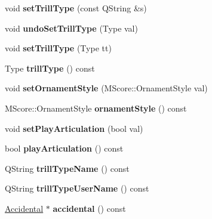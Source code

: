 \begin{DoxyCompactItemize}
\item 
\mbox{\label{class_ms_1_1_trill_a7a6342745108bbdc1ca0032acbcc9dfd}} 
void {\bfseries set\+Trill\+Type} (const Q\+String \&s)
\item 
\mbox{\label{class_ms_1_1_trill_a4a41947ba34f416a3ca8075a6f6a8668}} 
void {\bfseries undo\+Set\+Trill\+Type} (Type val)
\item 
\mbox{\label{class_ms_1_1_trill_ab25f59fa8464fa7de753c4535c2031d6}} 
void {\bfseries set\+Trill\+Type} (Type tt)
\item 
\mbox{\label{class_ms_1_1_trill_a7a3744b3771ce91da17ae84f13da8a06}} 
Type {\bfseries trill\+Type} () const
\item 
\mbox{\label{class_ms_1_1_trill_a7e5b4ea7fc1f68fe187d34d224c10cf0}} 
void {\bfseries set\+Ornament\+Style} (M\+Score\+::\+Ornament\+Style val)
\item 
\mbox{\label{class_ms_1_1_trill_acd76e83d33a46bd97437a5fe1b6a1bb1}} 
M\+Score\+::\+Ornament\+Style {\bfseries ornament\+Style} () const
\item 
\mbox{\label{class_ms_1_1_trill_ad1dbe5abcd5d5cd2f302f172e222a251}} 
void {\bfseries set\+Play\+Articulation} (bool val)
\item 
\mbox{\label{class_ms_1_1_trill_a0b0c10f0df260ba372696472b3b46cee}} 
bool {\bfseries play\+Articulation} () const
\item 
\mbox{\label{class_ms_1_1_trill_a76c1ae273cf3ff5233593906f7a9863e}} 
Q\+String {\bfseries trill\+Type\+Name} () const
\item 
\mbox{\label{class_ms_1_1_trill_ae6530f07395c2597ccf05a793b25cc2a}} 
Q\+String {\bfseries trill\+Type\+User\+Name} () const
\item 
\mbox{\label{class_ms_1_1_trill_acf2c7b2ee87a4ac5c9a3c3e7b25e1549}} 
\hyperlink{class_ms_1_1_accidental}{Accidental} $\ast$ {\bfseries accidental} () const

\end{DoxyCompactItemize}
